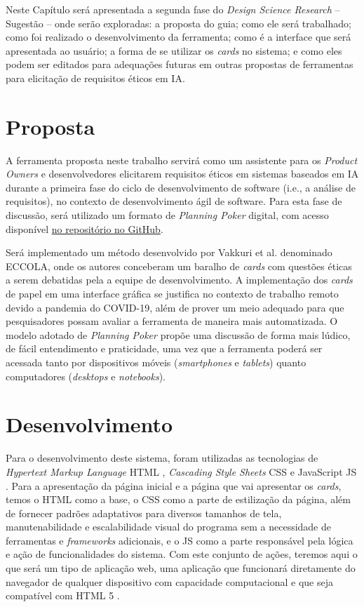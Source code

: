 \label{desenvolvimento}

Neste Capítulo será apresentada a segunda fase do \textit{Design Science Research} -- Sugestão -- onde serão exploradas: a proposta do guia; como ele será trabalhado; como foi realizado o desenvolvimento da ferramenta; como é a interface que será apresentada ao usuário; a forma de se utilizar os \textit{cards} no sistema; e como eles podem ser editados para adequações futuras em outras propostas de ferramentas para elicitação de requisitos éticos em \acrshort{IA}.

\section{Proposta}

A ferramenta proposta neste trabalho servirá como um assistente para os \textit{Product Owners} e desenvolvedores elicitarem requisitos éticos em sistemas baseados em IA durante a primeira fase do ciclo de desenvolvimento de software (i.e., a análise de requisitos), no contexto de desenvolvimento ágil de software. Para esta fase de discussão, será utilizado um formato de \textit{Planning Poker} digital, com acesso disponível \href{https://oggvaldo.GitHub.io/eccola}{no repositório no GitHub}.

Será implementado um método desenvolvido por Vakkuri et al. \cite{ECCOLA} denominado ECCOLA, onde os autores conceberam um baralho de \textit{cards} com questões éticas a serem debatidas pela a equipe de desenvolvimento. A implementação dos \textit{cards} de papel em uma interface gráfica se justifica no contexto de trabalho remoto devido a pandemia do COVID-19, além de prover um meio adequado para que pesquisadores possam avaliar a ferramenta de maneira mais automatizada. O modelo adotado de \textit{Planning Poker} propõe uma discussão de forma mais lúdico, de fácil entendimento e praticidade, uma vez que a ferramenta poderá ser acessada tanto por dispositivos móveis (\textit{smartphones} e \textit{tablets}) quanto computadores (\textit{desktops} e \textit{notebooks}).

\section{Desenvolvimento}

Para o desenvolvimento deste sistema, foram utilizadas as tecnologias de \textit{Hypertext Markup Language} \acrshort{HTML} \cite{HTMLsite}, \textit{Cascading Style Sheets} \acrshort{CSS} \cite{CSSsite} e JavaScript \acrshort{JS} \cite{JavaScriptsite}. Para a apresentação da página inicial e a página que vai apresentar os \textit{cards}, temos o \acrshort{HTML} como a base, o \acrshort{CSS} como a parte de estilização da página, além de fornecer padrões adaptativos para diversos tamanhos de tela, manutenabilidade e escalabilidade visual do programa sem a necessidade de ferramentas e \textit{frameworks} adicionais, e o \acrshort{JS} como a parte responsável pela lógica e ação de funcionalidades do sistema. Com este conjunto de ações, teremos aqui o que será um tipo de aplicação web, uma aplicação que funcionará diretamente do navegador de qualquer dispositivo com capacidade computacional e que seja compatível com \acrshort{HTML} 5 \cite{webapp}.

